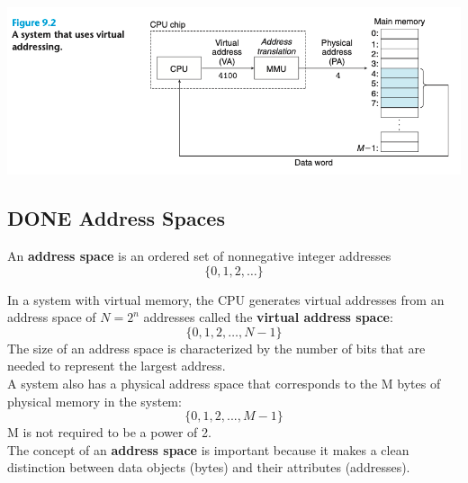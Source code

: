 \documentclass[11pt]{article}
\begin{document}
\begin{center}
\includegraphics[width=.9\linewidth]{pics/figure9.2-virtual-addressing.png}
\end{center}



\subsection{{\bfseries\sffamily DONE} Address Spaces}
\label{sec:orge3d684b}
An \textbf{address space} is an ordered set of nonnegative integer addresses\\
\begin{equation}
\{ 0, 1 ,2, \dots \}
\end{equation}

In a system with virtual memory, the CPU generates virtual addresses from an address space of \(N = 2^n\) addresses called the \textbf{virtual address space}:\\
\begin{equation}
\{ 0, 1, 2, \dots, N-1 \}
\end{equation}
The size of an address space is characterized by the number of bits that are needed to represent the largest address.\\

A system also has a physical address space that corresponds to the M bytes of physical memory in the system:\\
\begin{equation}
\{0,1,2,...,M −1\}
\end{equation}
M is not required to be a power of 2.\\

The concept of an \textbf{address space} is important because it makes a clean distinction between data objects (bytes) and their attributes (addresses).\\
\end{document}
